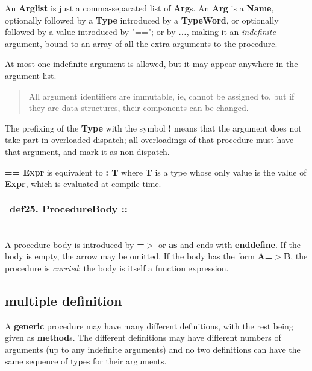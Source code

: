 \documentclass{report}
\begin{document}
An {\bf Arglist} is just a comma-separated list of {\bf Arg}s. An {\bf Arg} is a {\bf Name},
optionally followed by a {\bf Type} introduced by a {\bf TypeWord}, or optionally
followed by a value introduced by "=="; or by {\bf ...}, making it an {\em indefinite}
argument, bound to an array of all the extra arguments to the procedure.

At most one indefinite argument is allowed, but it may appear anywhere in the
argument list.

\begin{quote}All argument identifiers are immutable, ie, cannot be assigned to, but
if they are data-structures, their components can be changed.
\end{quote}The prefixing of the {\bf Type} with the symbol {\bf !} means that the argument
does not take part in overloaded dispatch; all overloadings of that procedure
must have that argument, and mark it as non-dispatch.

{\bf == Expr} is equivalent to {\bf : T} where {\bf T} is a type whose only value is the
value of {\bf Expr}, which is evaluated at compile-time.

\begin{tabular}{l}
{\bf def25. ProcedureBody ::= }\\ 
\hspace*{3mm}{\tt StatementSeq} \\ 
\hspace*{3mm}{\tt  $\mid$ ArgList "=$>$" ProcedureBody} \\ 
\hspace*{3mm}{\tt  $\mid$ Arg "=$>$" ProcedureBody} \\ 
\end{tabular}

A procedure body is introduced by {\bf =$>$} or {\bf as} and ends with {\bf enddefine}. If
the body is empty, the arrow may be omitted. If the body has the form {\bf A=$>$B},
the procedure is {\em curried}; the body is itself a function expression.

\subsection{multiple definition}


A {\bf generic} procedure may have many different definitions, with the rest being
given as {\bf method}s. The different definitions may have different numbers of
arguments (up to any indefinite arguments) and no two definitions can have the
same sequence of types for their arguments.
\end{document}
